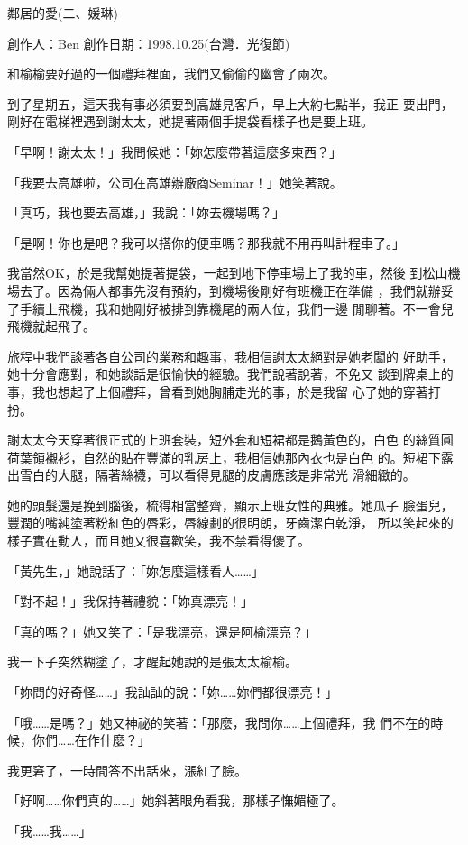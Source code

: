 鄰居的愛(二、媛琳)

創作人：Ben
創作日期：1998.10.25(台灣．光復節)


和榆榆要好過的一個禮拜裡面，我們又偷偷的幽會了兩次。

到了星期五，這天我有事必須要到高雄見客戶，早上大約七點半，我正
要出門，剛好在電梯裡遇到謝太太，她提著兩個手提袋看樣子也是要上班。

「早啊！謝太太！」我問候她：「妳怎麼帶著這麼多東西？」

「我要去高雄啦，公司在高雄辦廠商Seminar！」她笑著說。

「真巧，我也要去高雄，」我說：「妳去機場嗎？」

「是啊！你也是吧？我可以搭你的便車嗎？那我就不用再叫計程車了。」

我當然OK，於是我幫她提著提袋，一起到地下停車場上了我的車，然後
到松山機場去了。因為倆人都事先沒有預約，到機場後剛好有班機正在準備
，我們就辦妥了手續上飛機，我和她剛好被排到靠機尾的兩人位，我們一邊
閒聊著。不一會兒飛機就起飛了。

旅程中我們談著各自公司的業務和趣事，我相信謝太太絕對是她老闆的
好助手，她十分會應對，和她談話是很愉快的經驗。我們說著說著，不免又
談到牌桌上的事，我也想起了上個禮拜，曾看到她胸脯走光的事，於是我留
心了她的穿著打扮。

謝太太今天穿著很正式的上班套裝，短外套和短裙都是鵝黃色的，白色
的絲質圓荷葉領襯衫，自然的貼在豐滿的乳房上，我相信她那內衣也是白色
的。短裙下露出雪白的大腿，隔著絲襪，可以看得見腿的皮膚應該是非常光
滑細緻的。

她的頭髮還是挽到腦後，梳得相當整齊，顯示上班女性的典雅。她瓜子
臉蛋兒，豐潤的嘴純塗著粉紅色的唇彩，唇線劃的很明朗，牙齒潔白乾淨，
所以笑起來的樣子實在動人，而且她又很喜歡笑，我不禁看得傻了。

「黃先生，」她說話了：「妳怎麼這樣看人……」

「對不起！」我保持著禮貌：「妳真漂亮！」

「真的嗎？」她又笑了：「是我漂亮，還是阿榆漂亮？」

我一下子突然糊塗了，才醒起她說的是張太太榆榆。

「妳問的好奇怪……」我訕訕的說：「妳……妳們都很漂亮！」

「哦……是嗎？」她又神祕的笑著：「那麼，我問你……上個禮拜，我
們不在的時候，你們……在作什麼？」

我更窘了，一時間答不出話來，漲紅了臉。

「好啊……你們真的……」她斜著眼角看我，那樣子憮媚極了。

「我……我……」

